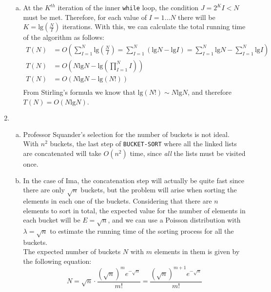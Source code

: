 \documentclass{article}
\begin{document}
\begin{enumerate}[1.]
\begin{enumerate}[(a)]
             \item At the $K^{th}$ iteration of the inner \texttt{while} loop, the condition $J = 2^K I < N$ must be met. Therefore, for each value of $I = 1 \ldots N$ there will be $K = \text{lg}\left(\frac{N}{I}\right)$ iterations. With this, we can calculate the total running time of the algorithm as follows:
             \begin{align*}
                 T(N) &= O\left(\sum_{I = 1}^N\text{lg}\left(\frac{N}{I}\right) = \sum_{I = 1}^N\left(\text{lg}N-\text{lg}I\right) = \sum_{I = 1}^N\text{lg}N - \sum_{I = 1}^N\text{lg}I\right)\\
                 T(N) &= O\left(N\text{lg}N - \text{lg}\left(\prod_{I = 1}^N I\right)\right)\\
                 T(N) &= O\left(N\text{lg}N - \text{lg}(N!)\right)\\
             \end{align*}
             From Stirling's formula we know that $\text{lg}(N!) \sim N\text{lg}N$, and therefore $T(N) = O(N \text{lg}N)$.
        \end{enumerate}
    \vspace{0.5cm}
    \item 
    \begin{enumerate}[(a)]
        \item Professor Squander's selection for the number of buckets is not ideal. With $n^2$ buckets, the last step of \texttt{BUCKET-SORT} where all the linked lists are concatenated will take $O(n^2)$ time, since \emph{all} the lists must be visited once.
        \item In the case of Ima, the concatenation step will actually be quite fast since there are only $\sqrt{n}$ buckets, but the problem will arise when sorting the elements in each one of the buckets. Considering that there are $n$ elements to sort in total, the expected value for the number of elements in each bucket will be $E = \sqrt{n}$, and we can use a Poisson distribution with $\lambda = \sqrt{n}$ to estimate the running time of the sorting process for all the buckets.\\
        The expected number of buckets $N$ with $m$ elements in them is given by the following equation:
        \begin{equation*}
            N = \sqrt{n} \cdot \frac{(\sqrt{n})^m e^{-\sqrt{n}}}{m!} = \frac{(\sqrt{n})^{m+1} e^{-\sqrt{n}}}{m!}
        \end{equation*}
        

\end{enumerate}
\end{enumerate}
\end{document}
